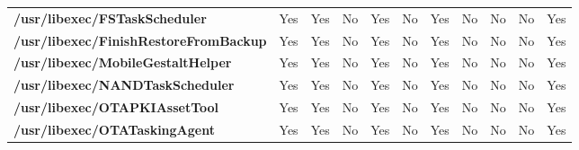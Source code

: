 \begin{center}
{\begin{tabular}{|>{\bfseries} l | C | C | C | C | C | C | C | C | C | C |}
					/usr/libexec/FSTaskScheduler & Yes & Yes & \color{green}No & \color{red}Yes & \color{green}No & \color{red}Yes & No & No & \color{green}No & \color{red}Yes\\ 
					/usr/libexec/FinishRestoreFromBackup & Yes & Yes & \color{green}No & \color{red}Yes & \color{green}No & \color{red}Yes & No & No & \color{green}No & \color{red}Yes\\ 
					/usr/libexec/MobileGestaltHelper & Yes & Yes & \color{green}No & \color{red}Yes & \color{green}No & \color{red}Yes & No & No & \color{green}No & \color{red}Yes\\ 
					/usr/libexec/NANDTaskScheduler & Yes & Yes & \color{green}No & \color{red}Yes & \color{green}No & \color{red}Yes & No & No & \color{green}No & \color{red}Yes\\ 
					/usr/libexec/OTAPKIAssetTool & Yes & Yes & \color{green}No & \color{red}Yes & \color{green}No & \color{red}Yes & No & No & \color{green}No & \color{red}Yes\\ 
					/usr/libexec/OTATaskingAgent & Yes & Yes & \color{green}No & \color{red}Yes & \color{green}No & \color{red}Yes & No & No & \color{green}No & \color{red}Yes\\ 

			\end{tabular}
		}
	\end{center}



